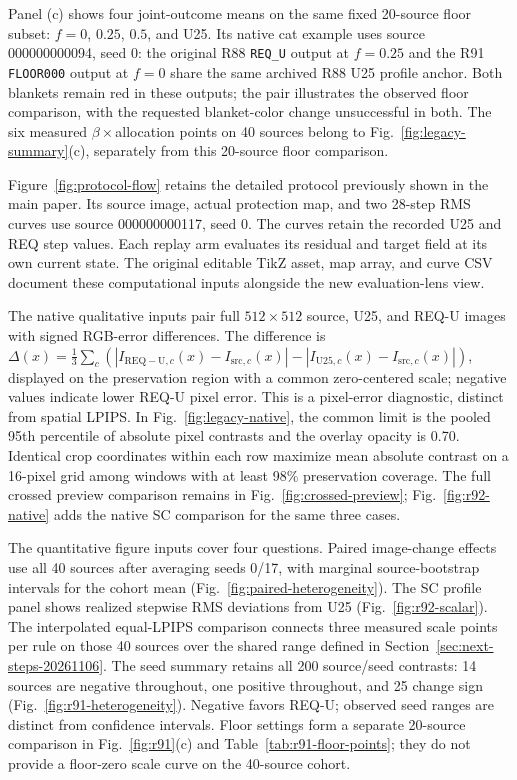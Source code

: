 \documentclass[10pt,doubleanonymous]{ieeeconf}
\begin{document}
Panel (c) shows four joint-outcome means on the same fixed 20-source floor subset: $f=0$, $0.25$, $0.5$, and U25. Its native cat example uses source 000000000094, seed 0: the original R88 \texttt{REQ\_U} output at $f=0.25$ and the R91 \texttt{FLOOR000} output at $f=0$ share the same archived R88 U25 profile anchor. Both blankets remain red in these outputs; the pair illustrates the observed floor comparison, with the requested blanket-color change unsuccessful in both. The six measured $\beta\times$allocation points on 40 sources belong to Fig.~\ref{fig:legacy-summary}(c), separately from this 20-source floor comparison.

Figure~\ref{fig:protocol-flow} retains the detailed protocol previously shown in the main paper. Its source image, actual protection map, and two 28-step RMS curves use source 000000000117, seed 0. The curves retain the recorded U25 and REQ step values. Each replay arm evaluates its residual and target field at its own current state. The original editable TikZ asset, map array, and curve CSV document these computational inputs alongside the new evaluation-lens view.

The native qualitative inputs pair full $512\times512$ source, U25, and REQ-U images with signed RGB-error differences. The difference is $\Delta(x)=\frac{1}{3}\sum_c(|I_{\mathrm{REQ-U},c}(x)-I_{\mathrm{src},c}(x)|-|I_{\mathrm{U25},c}(x)-I_{\mathrm{src},c}(x)|)$, displayed on the preservation region with a common zero-centered scale; negative values indicate lower REQ-U pixel error. This is a pixel-error diagnostic, distinct from spatial LPIPS. In Fig.~\ref{fig:legacy-native}, the common limit is the pooled 95th percentile of absolute pixel contrasts and the overlay opacity is 0.70. Identical crop coordinates within each row maximize mean absolute contrast on a 16-pixel grid among windows with at least 98\% preservation coverage. The full crossed preview comparison remains in Fig.~\ref{fig:crossed-preview}; Fig.~\ref{fig:r92-native} adds the native SC comparison for the same three cases.

The quantitative figure inputs cover four questions. Paired image-change effects use all 40 sources after averaging seeds 0/17, with marginal source-bootstrap intervals for the cohort mean (Fig.~\ref{fig:paired-heterogeneity}). The SC profile panel shows realized stepwise RMS deviations from U25 (Fig.~\ref{fig:r92-scalar}). The interpolated equal-LPIPS comparison connects three measured scale points per rule on those 40 sources over the shared range defined in Section~\ref{sec:next-steps-20261106}. The seed summary retains all 200 source/seed contrasts: 14 sources are negative throughout, one positive throughout, and 25 change sign (Fig.~\ref{fig:r91-heterogeneity}). Negative favors REQ-U; observed seed ranges are distinct from confidence intervals. Floor settings form a separate 20-source comparison in Fig.~\ref{fig:r91}(c) and Table~\ref{tab:r91-floor-points}; they do not provide a floor-zero scale curve on the 40-source cohort.
\end{document}

